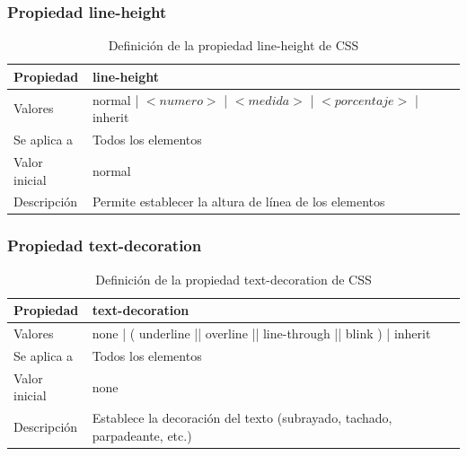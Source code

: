 \begin{frame}
\frametitle{Propiedad line-height}

\begin{center}
  \begin{table}
   \begin{tabular}{p{1.8cm}p{7.8cm}}
Propiedad & \bf{line-height} \\ \hline
Valores& normal | $<numero>$ | $<medida>$ | $<porcentaje>$ | inherit \\ \hline
Se aplica a& Todos los elementos \\ \hline
Valor inicial& normal \\ \hline
Descripción& Permite establecer la altura de línea de los elementos \\ \hline
  \end{tabular}
   \caption{Definición de la propiedad line-height de CSS}
 \end{table}
\end{center}


\end{frame}



\begin{frame}
\frametitle{Propiedad text-decoration}

\begin{center}
  \begin{table}
   \begin{tabular}{p{1.8cm}p{7.8cm}}
Propiedad & \bf{text-decoration} \\ \hline
Valores& none | ( underline || overline || line-through || blink ) | inherit \\ \hline
Se aplica a& Todos los elementos \\ \hline
Valor inicial& none \\ \hline
Descripción& Establece la decoración del texto (subrayado, tachado, parpadeante, etc.) \\ \hline
  \end{tabular}
   \caption{Definición de la propiedad text-decoration de CSS}
 \end{table}
\end{center}


\end{frame}



